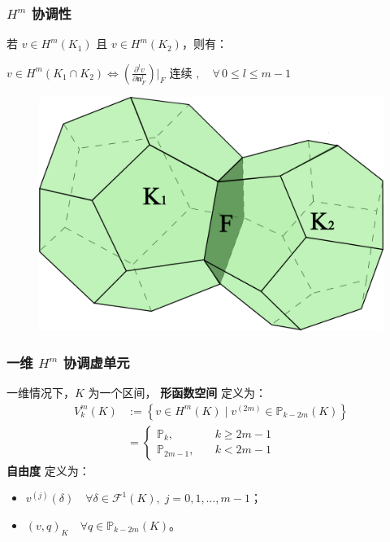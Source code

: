 \documentclass[notheorems,serif]{beamer}
\begin{document}
\begin{frame}
    \frametitle{$H^m$ 协调性}
    若 $v \in H^m(K_1)$ 且 $v \in H^m(K_2)$，则有：
    \vspace{0.5cm}

    \centering
    $v \in H^m(K_1 \cap K_2) \Longleftrightarrow  
    \left(\frac{\partial^l v}{\partial \boldsymbol{n}_F^l}\right)|_F \text{ 连续 }, \quad \forall \, 0 \leq l \leq m-1$

    \begin{figure}[H]
        \centering
        \includegraphics[scale=0.2]{../figures/dodecahedron.pdf}
    \end{figure} 
\end{frame}

\begin{frame}
\frametitle{一维 $H^m$ 协调虚单元}
一维情况下，$K$ 为一个区间，
\textbf{形函数空间} 定义为：
$$
\begin{aligned}
V_k^m(K) & := \left\{v \in H^m(K) \mid v^{(2m)}\in\mathbb{P}_{k-2m}(K)\right\}\\ 
& = \left\{ 
\begin{aligned}
    \mathbb{P}_{k}, \quad & k\geq 2m-1 \\
    \mathbb{P}_{2m-1}, \quad & k < 2m-1
\end{aligned}
\right.
\end{aligned}
$$
\textbf{自由度} 定义为：
\begin{itemize}
    \item $v^{(j)}(\delta) \quad \forall \delta \in \mathcal{F}^1(K),
        \; j = 0, 1, \dots, m-1$；
    \item $(v, q)_K \quad \forall q \in \mathbb{P}_{k-2m}(K)$。
\end{itemize}

\end{frame}
\end{document}
